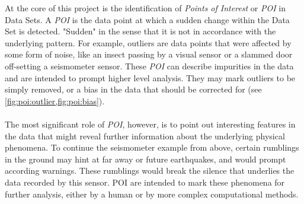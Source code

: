 \documentclass[main.tex]{subfiles}
\begin{document}
    At the core of this project is the identification of \textit{Points of Interest} or \textit{POI} in Data Sets. A \textit{POI} is the data point at which a sudden change within the Data Set is detected. "Sudden" in the sense that it is not in accordance with the underlying pattern. For example, outliers are data points that were affected by some form of noise, like an insect passing by a visual sensor or a slammed door off-setting a seismometer sensor. These \textit{POI} can describe impurities in the data and are intended to prompt higher level analysis. They may mark outliers to be simply removed, or a bias in the data that should be corrected for (see \cref{fig:poi:outlier,fig:poi:bias}). 
    \\\\
    The most significant role of \textit{POI}, however, is to point out interesting features in the data that might reveal further information about the underlying physical phenomena. To continue the seismometer example from above, certain rumblings in the ground may hint at far away or future earthquakes, and would prompt according warnings. These rumblings would break the silence that underlies the data recorded by this sensor. POI are intended to mark these phenomena for further analysis, either by a human or by more complex computational methods.
    \\
\end{document}

